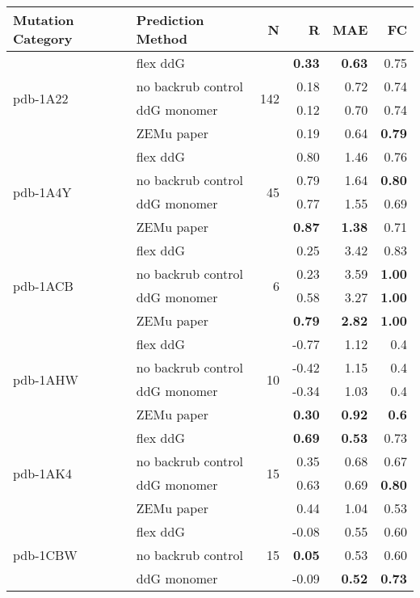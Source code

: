 \begin{longtable}{llrrrr}
\toprule
Mutation Category &   Prediction Method &   N &     R &  MAE &   FC \\
\midrule
 \multirow{ 4}{*}{pdb-1A22} & flex ddG & \multirow{ 4}{*}{142} & \textbf{0.33} & \textbf{0.63} & 0.75  \\
 & no backrub control & & 0.18 & 0.72 & 0.74  \\
 & ddG monomer & & 0.12 & 0.70 & 0.74  \\
 & ZEMu paper & & 0.19 & 0.64 & \textbf{0.79}  \\
\hline
 \multirow{ 4}{*}{pdb-1A4Y} & flex ddG & \multirow{ 4}{*}{45} & 0.80 & 1.46 & 0.76  \\
 & no backrub control & & 0.79 & 1.64 & \textbf{0.80}  \\
 & ddG monomer & & 0.77 & 1.55 & 0.69  \\
 & ZEMu paper & & \textbf{0.87} & \textbf{1.38} & 0.71  \\
\hline
 \multirow{ 4}{*}{pdb-1ACB} & flex ddG & \multirow{ 4}{*}{6} & 0.25 & 3.42 & 0.83  \\
 & no backrub control & & 0.23 & 3.59 & \textbf{1.00}  \\
 & ddG monomer & & 0.58 & 3.27 & \textbf{1.00}  \\
 & ZEMu paper & & \textbf{0.79} & \textbf{2.82} & \textbf{1.00}  \\
\hline
 \multirow{ 4}{*}{pdb-1AHW} & flex ddG & \multirow{ 4}{*}{10} & -0.77 & 1.12 & 0.4  \\
 & no backrub control & & -0.42 & 1.15 & 0.4  \\
 & ddG monomer & & -0.34 & 1.03 & 0.4  \\
 & ZEMu paper & & \textbf{0.30} & \textbf{0.92} & \textbf{0.6}  \\
\hline
 \multirow{ 4}{*}{pdb-1AK4} & flex ddG & \multirow{ 4}{*}{15} & \textbf{0.69} & \textbf{0.53} & 0.73  \\
 & no backrub control & & 0.35 & 0.68 & 0.67  \\
 & ddG monomer & & 0.63 & 0.69 & \textbf{0.80}  \\
 & ZEMu paper & & 0.44 & 1.04 & 0.53  \\
\hline
 \multirow{ 4}{*}{pdb-1CBW} & flex ddG & \multirow{ 4}{*}{15} & -0.08 & 0.55 & 0.60  \\
 & no backrub control & & \textbf{0.05} & 0.53 & 0.60  \\
 & ddG monomer & & -0.09 & \textbf{0.52} & \textbf{0.73}  \\

\end{longtable}
